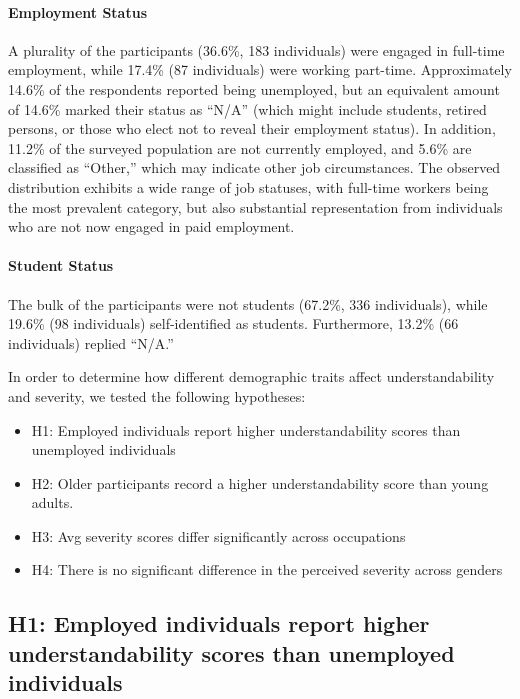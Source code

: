 \paragraph{Employment Status}
A plurality of the participants (36.6\%, 183 individuals) were engaged in full-time employment, while 17.4\% (87 individuals) were working part-time.
Approximately 14.6\% of the respondents reported being unemployed, but an equivalent amount of 14.6\% marked their status as ``N/A'' (which might include students, retired persons, or those who elect not to reveal their employment status).
In addition, 11.2\% of the surveyed population are not currently employed, and 5.6\% are classified as ``Other,'' which may indicate other job circumstances.
The observed distribution exhibits a wide range of job statuses, with full-time workers being the most prevalent category, but also substantial representation from individuals who are not now engaged in paid employment.

\paragraph{Student Status}
The bulk of the participants were not students (67.2\%, 336 individuals), while 19.6\% (98 individuals) self-identified as students.
Furthermore, 13.2\% (66 individuals) replied ``N/A.''


In order to determine how different demographic traits affect understandability and severity, we tested the following  hypotheses:
\begin{itemize}
\item H1: Employed individuals report higher understandability scores than unemployed individuals
\item H2: Older participants record a higher understandability score than young adults.
\item H3: Avg severity scores differ significantly across occupations
\item H4: There is no significant difference in the perceived severity across genders
\end{itemize}



\subsection{H1: Employed individuals report higher understandability scores than unemployed individuals}

